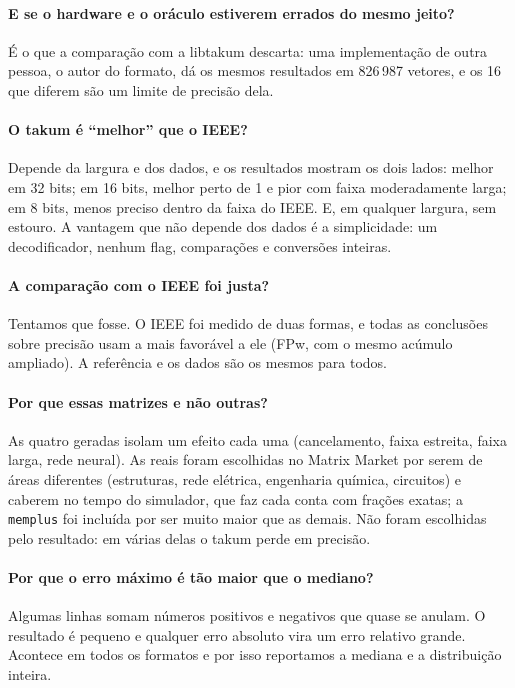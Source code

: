 \documentclass[11pt,a4paper]{article}
\newcommand{\code}[1]{\texttt{#1}}
\begin{document}
\paragraph{E se o hardware e o oráculo estiverem errados do mesmo jeito?} É o que a comparação com a
libtakum descarta: uma implementação de outra pessoa, o autor do formato, dá os mesmos resultados em
826\,987 vetores, e os 16 que diferem são um limite de precisão dela.

\paragraph{O takum é ``melhor'' que o IEEE?} Depende da largura e dos dados, e os resultados mostram os
dois lados: melhor em 32 bits; em 16 bits, melhor perto de 1 e pior com faixa moderadamente larga; em 8
bits, menos preciso dentro da faixa do IEEE. E, em qualquer largura, sem estouro. A vantagem que não depende dos dados é a simplicidade: um
decodificador, nenhum flag, comparações e conversões inteiras.

\paragraph{A comparação com o IEEE foi justa?} Tentamos que fosse. O IEEE foi medido de duas formas, e
todas as conclusões sobre precisão usam a mais favorável a ele (FPw, com o mesmo acúmulo ampliado). A
referência e os dados são os mesmos para todos.

\paragraph{Por que essas matrizes e não outras?} As quatro geradas isolam um efeito cada uma
(cancelamento, faixa estreita, faixa larga, rede neural). As reais foram escolhidas no Matrix Market por serem de áreas
diferentes (estruturas, rede elétrica, engenharia química, circuitos) e caberem no tempo do simulador,
que faz cada conta com frações exatas; a \code{memplus} foi incluída por ser muito maior que as demais.
Não foram escolhidas pelo resultado: em várias delas o takum perde em precisão.

\paragraph{Por que o erro máximo é tão maior que o mediano?} Algumas linhas somam números positivos e
negativos que quase se anulam. O resultado é pequeno e qualquer erro absoluto vira um erro relativo
grande. Acontece em todos os formatos e por isso reportamos a mediana e a distribuição inteira.
\end{document}
